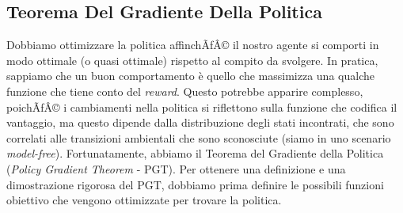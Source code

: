 ﻿\documentclass[11pt, a4paper]{report}
\begin{document}
\subsection{Teorema Del Gradiente Della Politica}
Dobbiamo ottimizzare la politica affinchÃƒÂ© il nostro agente si comporti in modo ottimale (o quasi ottimale) rispetto al compito da svolgere. In pratica, sappiamo che un buon comportamento è quello che massimizza una qualche funzione che tiene conto del \emph{reward}. Questo potrebbe apparire complesso, poichÃƒÂ© i cambiamenti nella politica si riflettono sulla funzione che codifica il vantaggio, ma questo dipende dalla distribuzione degli stati incontrati, che sono correlati alle transizioni ambientali che sono sconosciute (siamo in uno scenario \emph{model-free}). Fortunatamente, abbiamo il Teorema del Gradiente della Politica (\emph{Policy Gradient Theorem} - PGT). Per ottenere una definizione e una dimostrazione rigorosa del PGT, dobbiamo prima definire le possibili funzioni obiettivo che vengono ottimizzate per trovare la politica.
\end{document}
